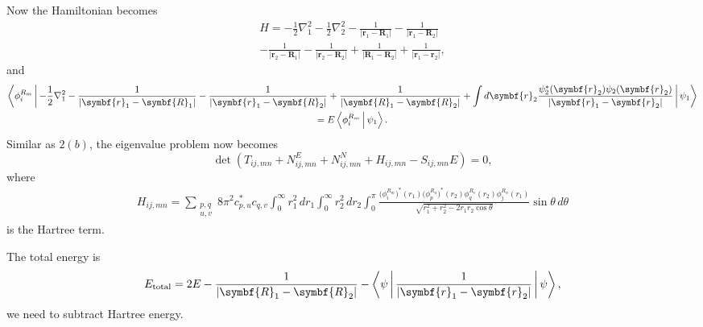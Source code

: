 \documentclass[12pt]{article}
\begin{document}
Now the Hamiltonian becomes
%
\begin{multline}
    H = -\frac{1}{2}\nabla_1^2 - \frac{1}{2}\nabla_2^2
    - \frac{1}{\lvert \symbf{r}_1 - \symbf{R}_1 \rvert} - \frac{1}{\lvert \symbf{r}_1 - \symbf{R}_2 \rvert}\\
    - \frac{1}{\lvert \symbf{r}_2 - \symbf{R}_1 \rvert} - \frac{1}{\lvert \symbf{r}_2 - \symbf{R}_2 \rvert}
    + \frac{1}{\lvert \symbf{R}_1 - \symbf{R}_2 \rvert} + \frac{1}{\lvert \symbf{r}_1 - \symbf{r}_2 \rvert},
\end{multline}
%
and
%
\begin{multline}
    \Braket{\phi_i^{R_m} |
        - \frac{1}{2}\nabla_1^2 - \frac{1}{\lvert \symbf{r}_1 - \symbf{R}_1 \rvert}
        - \frac{1}{\lvert \symbf{r}_1 - \symbf{R}_2 \rvert}
        + \frac{1}{\lvert \symbf{R}_1 - \symbf{R}_2 \rvert}
        + \int d\symbf{r}_2 \frac{\psi_2^\ast (\symbf{r}_2) \psi_2(\symbf{r}_2)}{\lvert \symbf{r}_1 - \symbf{r}_2 \rvert}
        | \psi_1}\\
    = E \Braket{\phi_i^{R_m} | \psi_1}.
\end{multline}
%
Similar as $2(b)$, the eigenvalue problem now becomes
%
\begin{equation}
    \det(T_{ij, mn} + N^E_{ij, mn} + N^N_{ij, mn} + H_{ij, mn} - S_{ij, mn} E) = 0,
\end{equation}
%
where
%
\begin{multline}
    H_{ij, mn} = \sum_{\substack{p, q\\u, v}} 8\pi^2 c_{p, u}^\ast c_{q, v}
    \! \int_{0}^{\infty} r_1^2 \, dr_1 \! \int_{0}^{\infty} r_2^2 \, dr_2 \! \int_{0}^{\pi}
    \tfrac{\bigl( \phi_i^{R_m} \bigr)^\ast(r_1) \bigl(\phi_p^{R_u} \bigr)^\ast(r_2)%
        \phi_q^{R_v}(r_2)\phi_j^{R_n}(r_1)}{\sqrt{r_1^2 + r_2^2 - 2 r_1 r_2 \cos\theta}}
    \sin\theta\, d\theta
\end{multline}
%
is the Hartree term.

The total energy is
%
\begin{equation}
    E_{\text{total}} = 2 E - \frac{1}{\lvert \symbf{R}_1 - \symbf{R}_2 \rvert} -
    \Braket{\psi | \frac{1}{\lvert \symbf{r}_1 - \symbf{r}_2 \rvert} | \psi},
\end{equation}
%
we need to subtract Hartree energy.

\end{document}
